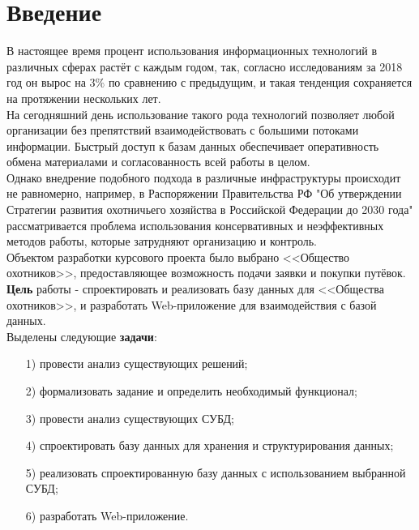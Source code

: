 \section*{Введение}
	
	В настоящее время процент использования информационных технологий в различных сферах растёт с каждым годом, так, согласно исследованиям \cite{Russia-in-numbers} за 2018 год он вырос на $3\%$ по сравнению с предыдущим, и такая тенденция сохраняется на протяжении нескольких лет.\\

	На сегодняшний день использование такого рода технологий позволяет любой организации без препятствий взаимодействовать с большими потоками информации. Быстрый доступ к базам данных обеспечивает оперативность обмена материалами и согласованность всей работы в целом. \\
	
	Однако внедрение подобного подхода в различные инфраструктуры происходит не равномерно, например, в Распоряжении Правительства РФ "Об утверждении Стратегии развития охотничьего хозяйства в Российской Федерации до 2030 года" \cite{doc_problems} рассматривается проблема использования консервативных и неэффективных методов работы, которые затрудняют организацию и контроль. \\
	
	Объектом разработки курсового проекта было выбрано <<Общество охотников>>, предоставляющее возможность подачи заявки и покупки путёвок. \\
	
	\textbf{Цель} работы - спроектировать и реализовать базу данных для <<Общества охотников>>, и разработать Web-приложение для взаимодействия с базой данных.\\
	Выделены следующие \textbf{задачи}:
	\begin{enumerate}
		\item[1)] провести анализ существующих решений;
		\item[2)] формализовать задание и определить необходимый функционал;
		\item[3)] провести анализ существующих СУБД;
		\item[4)] спроектировать базу данных для хранения и структурирования данных;
		\item[5)] реализовать спроектированную базу данных с использованием выбранной СУБД;
		\item[6)] разработать Web-приложение.
	\end{enumerate}
	  